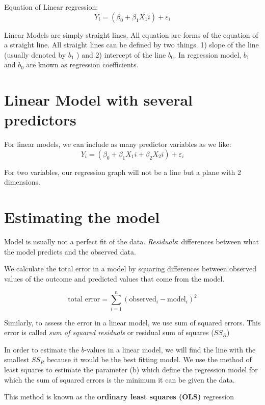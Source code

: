 Equation of Linear regression:
\begin{equation}
Y_i = (\beta_0 + \beta_1X_1i) + \varepsilon_i
\end{equation}

Linear Models are simply straight lines. All equation are forms of the equation of a straight line. All straight lines can be defined by two things. 1) slope of the line (usually denoted by $b_1$ ) and 2) intercept of the line $b_0$. In regression model, $b_1$ and $b_0$ are known as regression coefficients.

\section{Linear Model with several predictors}
For linear models, we can include as many predictor variables as we like:
\begin{equation}
Y_i = (\beta_0 + \beta_1X_1i + \beta_2X_2i) + \varepsilon_i
\end{equation}

For two variables, our regression graph will not be a line but a plane with 2 dimensions.

\section{Estimating the model}
Model is usually not a perfect fit of the data.
\emph{Residuals}: differences between what the model predicts and the observed data. 

We calculate the total error in a model by squaring differences between observed values of the outcome and predicted values that come from the model.

\begin{equation}
\text{total error} = \sum^n_{i=1} (\text{observed}_i - \text{model}_i)^2
\end{equation}

Similarly, to assess the error in a linear model, we use sum of squared errors. This error is called \emph{sum of squared residuals} or residual sum of squares ($SS_R$)

In order to estimate the $b$-values in a linear model, we will find the line with the smallest $SS_R$ because it would be the best fitting model. We use the method of least squares to estimate the parameter (b) which define the regression model for which the sum of squared errors is the minimum it can be given the data. 

This method is known as the \textbf{ordinary least squares (OLS)} regression

